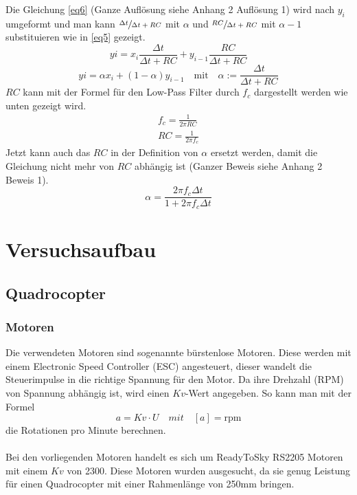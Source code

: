 \documentclass[12pt,a4paper, ngerman]{article}
\begin{document}
\newpage
\noindent
Die Gleichung \ref{eq6} (Ganze Auflösung siehe Anhang 2 Auflösung 1) wird nach $y_{i}$ umgeformt und man kann $\sfrac{\Delta t}{\Delta t+RC}$  mit $\alpha$ und $\sfrac{RC}{\Delta t + RC}$ mit $\alpha-1$ substituieren wie in \ref{eq5} gezeigt.
\begin{equation} \label{eq6}
y{i}=x_{i}\frac{\Delta t}{\Delta t+RC} + y_{i-1}\frac{RC}{\Delta t+RC}
\end{equation} 
\begin{equation}\label{eq5}
y{i}=\alpha x_{i} + (1-\alpha)y_{i-1} \quad \text{mit} \quad \alpha:=\frac{\Delta t}{\Delta t+RC}
\end{equation}
$RC$ kann mit der Formel für den Low-Pass Filter durch $f_{c}$ dargestellt werden wie unten gezeigt wird.
\begin{align*}
f_{c} = \frac{1}{2\pi RC} \\
RC = \frac{1}{2\pi f_{c}} 
\end{align*}
Jetzt kann auch das $RC$ in der Definition von $\alpha$ ersetzt werden, damit die Gleichung nicht mehr von $RC$ abhängig ist (Ganzer Beweis siehe Anhang 2 Beweis 1).
\begin{equation*}
\alpha = \frac{2\pi f_{c}\Delta t}{1+2\pi f_{c}\Delta t} 
\end{equation*}
\newpage
\section{Versuchsaufbau}
\subsection{Quadrocopter}
\subsubsection{Motoren}
Die verwendeten Motoren sind sogenannte bürstenlose Motoren. Diese werden mit einem Electronic Speed Controller (ESC) angesteuert, dieser wandelt die Steuerimpulse in die richtige Spannung für den Motor. Da ihre Drehzahl (RPM) von Spannung abhängig ist, wird einen $Kv$-Wert angegeben. So kann man mit der Formel
\begin{equation}
a=Kv\cdot U \quad mit \quad [a]=\text{rpm}
\end{equation}
die Rotationen pro Minute berechnen.\\ \\
Bei den vorliegenden Motoren handelt es sich um ReadyToSky RS2205 Motoren mit einem $Kv$ von 2300. Diese Motoren wurden ausgesucht, da sie genug Leistung für einen Quadrocopter mit einer Rahmenlänge von 250mm bringen.
\end{document}
